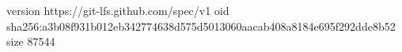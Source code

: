 version https://git-lfs.github.com/spec/v1
oid sha256:a3b08f931b012eb342774638d575d5013060aacab408a8184e695f292dde8b52
size 87544

